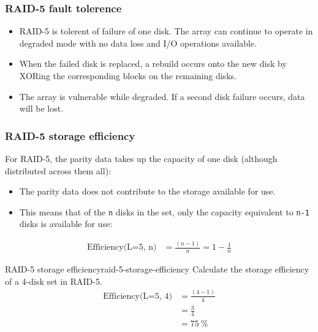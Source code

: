 \documentclass[slides]{pgnotes}
\begin{document}
\newpage
\subsubsection{RAID-5 fault tolerence}
\label{sec:raid-5-fault-tolerence}

\begin{itemize}
\item
  RAID-5 is tolerent of failure of one disk. The array can continue to
  operate in degraded mode with no data loss and I/O operations
  available.
\item
  When the failed disk is replaced, a rebuild occurs onto the new disk
  by XORing the corresponding blocks on the remaining disks.
\item
  The array is vulnerable while degraded. If a second disk failure
  occurs, data will be lost.
\end{itemize}


\newpage
\subsubsection{RAID-5 storage efficiency}
\label{sec:raid-5-storage-efficiency}

For RAID-5, the parity data takes up the capacity of one disk (although
distributed across them all):
\begin{itemize}
\item The parity data does not contribute to the storage available for use.
\item This means that of the \texttt{n} disks in the set, only the capacity equivalent to \texttt{n-1} disks is available for use:
\end{itemize}
\begin{align}
  \mbox{Efficiency(L=5, n)} & =  \frac{( n - 1 )}{n}  =  1 - \frac{1}{n} \label{eq:raid-5-storage-efficiency}
\end{align}

\begin{example}{RAID-5 storage efficiency}{raid-5-storage-efficiency}
  Calculate the storage efficiency of a 4-disk set in RAID-5.
  \tcblower
  \begin{align}
  \mbox{Efficiency(L=5, 4)} & =  \frac{( 4 - 1 )}{4}  \\
                            & = \frac{3}{4} \\
                            & = \SI{75}{\percent} 
  \end{align}  
\end{example}
\end{document}
